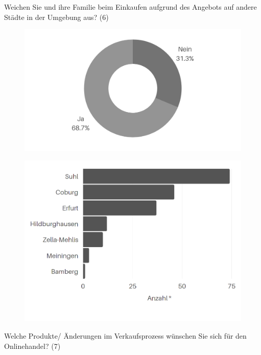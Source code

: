 \documentclass[a4paper, 12pt]{scrartcl}
\begin{document}
\newpage\noindent Weichen Sie und ihre Familie beim Einkaufen aufgrund des Angebots auf andere Städte in der Umgebung aus? (6)\\
\vfill
\begin{figure}[H]
    \begin{center}
        \includegraphics[width=12cm]{media/schuelerumfrage/6.1.png}
    \end{center}
\end{figure}
\vfill
\begin{figure}[H]
    \begin{center}
        \includegraphics[width=12cm]{media/schuelerumfrage/6.2.png}
    \end{center}
\end{figure}
\vfill



\newpage\noindent Welche Produkte/ Änderungen im Verkaufsprozess wünschen Sie sich für den Onlinehandel? (7)\\\\
\end{document}
